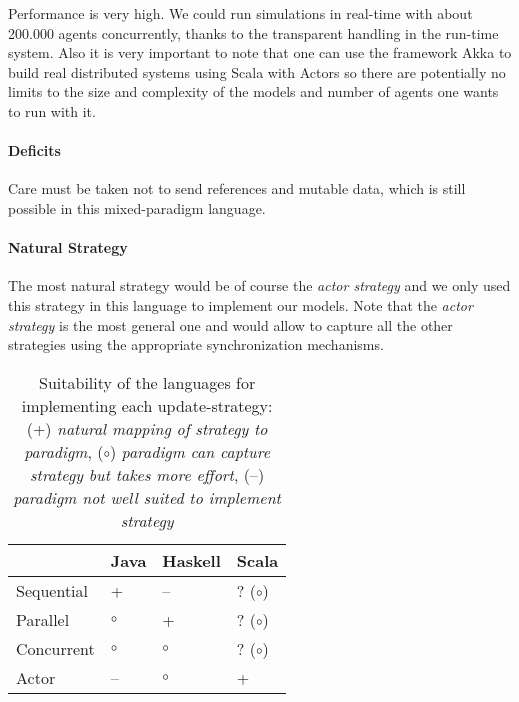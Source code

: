 Performance is very high. We could run simulations in real-time with about 200.000 agents concurrently, thanks to the transparent handling in the run-time system. Also it is very important to note that one can use the framework Akka to build real distributed systems using Scala with Actors so there are potentially no limits to the size and complexity of the models and number of agents one wants to run with it.

\paragraph{Deficits}
Care must be taken not to send references and mutable data, which is still possible in this mixed-paradigm language.

\paragraph{Natural Strategy}
The most natural strategy would be of course the \textit{actor strategy} and we only used this strategy in this language to implement our models. Note that the \textit{actor strategy} is the most general one and would allow to capture all the other strategies using the appropriate synchronization mechanisms.



\begin{table*}[t]
\centering

\label{tab:language_comparisons}
\begin{tabular}{l || l | l | l  }
	 			& Java 	& Haskell 	& Scala	\\ \hline \hline

Sequential		& +				& --			& ? ($ \circ $)		\\  
Parallel		& $ \circ $		& +				& ?	($ \circ $)		\\  
Concurrent		& $ \circ $		& $ \circ $		& ?	($ \circ $)		\\  
Actor			& --			& $ \circ $		& +			\\  

\end{tabular}
\caption{Suitability of the languages for implementing each update-strategy: (+) \textit{natural mapping of strategy to paradigm}, ($ \circ $) \textit{paradigm can capture strategy but takes more effort}, (--) \textit{paradigm not well suited to implement strategy}}
\end{table*}